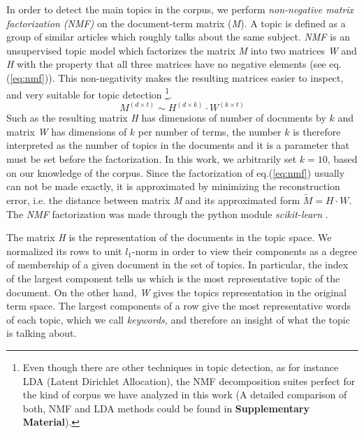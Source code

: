 \documentclass{bmcart}
\begin{document}
\par In order to detect the main topics in the corpus, we perform \emph{non-negative matrix factorization (NMF)} \cite{xu2003document, lee1999learning} on the document-term matrix (\emph{M}). A topic is defined as a  group of similar articles which roughly talks about the same subject. 
\emph{NMF} is an unsupervised topic model which factorizes the matrix \emph{M} into two matrices \emph{W} and \emph{H} with the property that all three matrices have no negative elements (see eq.(\ref{eq:nmf})).
This non-negativity makes the resulting matrices easier to inspect, and very suitable for topic detection \footnote{ Even though there are other techniques in topic detection, as for instance LDA (Latent Dirichlet Allocation), the NMF decomposition suites perfect for the kind of corpus we  have analyzed in this work (A detailed comparison of both, NMF and LDA methods could be found in \textbf{Supplementary Material}).}. 
\begin{equation}
M^{(d \times t)} \sim H^{(d \times k)} \cdot W^{(k \times t)}
\label{eq:nmf}
\end{equation}
Such as the resulting matrix \emph{H} has dimensions of number of documents by $k$ and matrix \emph{W} has dimensions of $k$ per number of terms, the number $k$ is therefore interpreted as the number of topics in the documents and it is a parameter that must be set before the factorization.
In this work, we arbitrarily set $k=10$, based on our knowledge of the corpus.
Since the factorization of eq.(\ref{eq:nmf}) usually can not be made exactly, it is approximated by minimizing the reconstruction error, i.e. the distance between matrix \emph{M} and its approximated form $\tilde{M} = H \cdot W$. The \emph{NMF} factorization was made through the python module \emph{scikit-learn} \cite{scikit-learn}.


\par The matrix \emph{H} is the representation of the documents in the topic space. We normalized its rows to unit $l_1$-norm in order to view their components as a degree of membership of a given document in the set of topics. In particular, the index of the largest component tells us which is the most representative topic of the document.
On the other hand, \emph{W} gives the topics representation in the original term space. The largest components of a row give the most representative words of each topic, which we call \emph{keywords}, and therefore an insight of what the topic is talking about.
\end{document}
